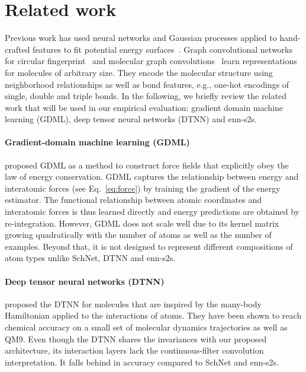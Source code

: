\documentclass{article}
\begin{document}
\section{Related work}

Previous work has used neural networks and Gaussian processes applied to hand-crafted features to fit potential energy surfaces~\citep{manzhos2006random,malshe2009development,behler2007generalized,bartok2010gaussian,behler2011atom,bartok2013representing}.
Graph convolutional networks for circular fingerprint~\citep{duvenaud2015convolutional} and molecular graph convolutions~\citep{Kearnes2016} learn representations for molecules of arbitrary size.
They encode the molecular structure using neighborhood relationships as well as bond features, e.g., one-hot encodings of single, double and triple bonds.
In the following, we briefly review the related work that will be used in our empirical evaluation: gradient domain machine learning (GDML), deep tensor neural networks (DTNN) and enn-s2s.

\paragraph*{Gradient-domain machine learning (GDML)} \citet{chmiela2017machine} proposed GDML as a method to construct force fields that explicitly obey the law of energy conservation. GDML captures the relationship between energy and interatomic forces (see Eq.~\ref{eq:force}) by training the gradient of the energy estimator. The functional relationship between atomic coordinates and interatomic forces is thus learned directly and energy predictions are obtained by re-integration.
However, GDML does not scale well due to its kernel matrix growing quadratically with the number of atoms as well as the number of examples.
Beyond that, it is not designed to represent different compositions of atom types unlike SchNet, DTNN and enn-s2s.

\paragraph*{Deep tensor neural networks (DTNN)} \citet{schutt2017quantum} proposed the DTNN for molecules that are inspired by the many-body Hamiltonian applied to the interactions of atoms. They have been shown to reach chemical accuracy on a small set of molecular dynamics trajectories as well as QM9. 
Even though the DTNN shares the invariances with our proposed architecture, its interaction layers lack the continuous-filter convolution interpretation.
It falls behind in accuracy compared to SchNet and enn-s2s.
\end{document}
